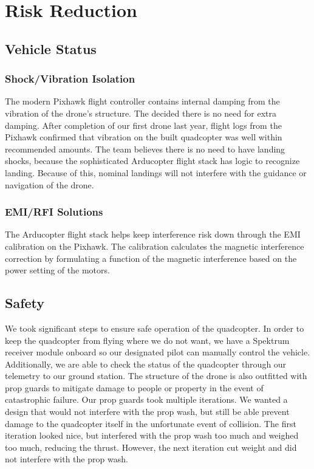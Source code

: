 \documentclass[12pt,letterpaper]{article}
\begin{document}
\section*{Risk Reduction}
	\subsection*{Vehicle Status}
		\subsubsection*{Shock/Vibration Isolation}
		The modern Pixhawk flight controller contains internal damping from the vibration of the drone's structure. The decided there is no need for extra damping. After completion of our first drone last year, flight logs from the Pixhawk confirmed that vibration on the built quadcopter was well within recommended amounts. The team believes there is no need to have landing shocks, because the sophisticated Arducopter flight stack has logic to recognize landing. Because of this, nominal landings will not interfere with the guidance or navigation of the drone.

		\subsubsection*{EMI/RFI Solutions}
		The Arducopter flight stack helps keep interference risk down through the EMI calibration on the Pixhawk. The calibration calculates the magnetic interference correction by formulating a function of the magnetic interference based on the power setting of the motors.


	\subsection*{Safety}
		We took significant steps to ensure safe operation of the quadcopter. In order to keep the quadcopter from flying where we do not want, we have a Spektrum receiver module onboard so our designated pilot can manually control the vehicle. Additionally, we are able to check the status of the quadcopter through our telemetry to our ground station. The structure of the drone is also outfitted with prop guards to mitigate damage to people or property in the event of catastrophic failure. Our prop guards took multiple iterations. We wanted a design that would not interfere with the prop wash, but still be able prevent damage to the quadcopter itself in the unfortunate event of collision. The first iteration looked nice, but interfered with the prop wash too much and weighed too much, reducing the thrust. However, the next iteration cut weight and did not interfere with the prop wash.
\end{document}
